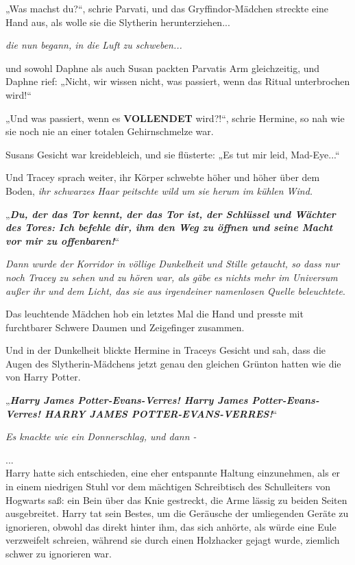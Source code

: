 {„Was machst du?“, schrie Parvati, und das Gryffindor-Mädchen streckte eine Hand aus, als wolle sie die Slytherin herunterziehen...

\emph{die nun begann, in die Luft zu schweben...}

und sowohl Daphne als auch Susan packten Parvatis Arm gleichzeitig, und Daphne rief: „Nicht, wir wissen nicht, was passiert, wenn das Ritual unterbrochen wird!“

„Und was passiert, wenn es \textbf{VOLLENDET} wird?!“, schrie Hermine, so nah wie sie noch nie an einer totalen Gehirnschmelze war.

Susans Gesicht war kreidebleich, und sie flüsterte: „Es tut mir leid, Mad-Eye...“

Und Tracey sprach weiter, ihr Körper schwebte höher und höher über dem Boden, \emph{ihr schwarzes Haar peitschte wild um sie herum im kühlen Wind.}

„\textbf{\emph{Du, der das Tor kennt, der das Tor ist, der Schlüssel und Wächter des Tores: Ich befehle dir, ihm den Weg zu öffnen und seine Macht vor mir zu offenbaren!}}“

\emph{Dann wurde der Korridor in völlige Dunkelheit und Stille getaucht, so dass nur noch Tracey zu sehen und zu hören war, als gäbe es nichts mehr im Universum außer ihr und dem Licht, das sie aus irgendeiner namenlosen Quelle beleuchtete}.

Das leuchtende Mädchen hob ein letztes Mal die Hand und presste mit furchtbarer Schwere Daumen und Zeigefinger zusammen.

Und in der Dunkelheit blickte Hermine in Traceys Gesicht und sah, dass die Augen des Slytherin-Mädchens jetzt genau den gleichen Grünton hatten wie die von Harry Potter.

„\textbf{\emph{Harry James Potter-Evans-Verres! Harry James Potter-Evans-Verres! HARRY JAMES POTTER-EVANS-VERRES!}}“

\emph{Es knackte wie ein Donnerschlag, und dann -}

\hfill\break ...\\ Harry hatte sich entschieden, eine eher entspannte Haltung einzunehmen, als er in einem niedrigen Stuhl vor dem mächtigen Schreibtisch des Schulleiters von Hogwarts saß: ein Bein über das Knie gestreckt, die Arme lässig zu beiden Seiten ausgebreitet. Harry tat sein Bestes, um die Geräusche der umliegenden Geräte zu ignorieren, obwohl das direkt hinter ihm, das sich anhörte, als würde eine Eule verzweifelt schreien, während sie durch einen Holzhacker gejagt wurde, ziemlich schwer zu ignorieren war.

}
